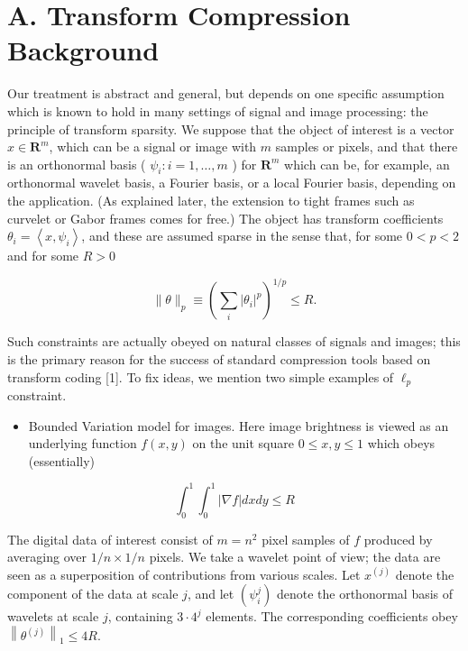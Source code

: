 \documentclass[10pt]{article}
\begin{document}
\section*{A. Transform Compression Background}
Our treatment is abstract and general, but depends on one specific assumption which is known to hold in many settings of signal and image processing: the principle of transform sparsity. We suppose that the object of interest is a vector $x \in \boldsymbol{R}^{m}$, which can be a signal or image with $m$ samples or pixels, and that there is an orthonormal basis ( $\psi_{i}: i=1, \ldots, m$ ) for $\boldsymbol{R}^{m}$ which can be, for example, an orthonormal wavelet basis, a Fourier basis, or a local Fourier basis, depending on the application. (As explained later, the extension to tight frames such as curvelet or Gabor frames comes for free.) The object has transform coefficients $\theta_{i}=\left\langle x, \psi_{i}\right\rangle$, and these are assumed sparse in the sense that, for some $0<p<2$ and for some $R>0$


\begin{equation*}
\|\theta\|_{p} \equiv\left(\sum_{i}\left|\theta_{i}\right|^{p}\right)^{1 / p} \leq R . \tag{I.1}
\end{equation*}


Such constraints are actually obeyed on natural classes of signals and images; this is the primary reason for the success of standard compression tools based on transform coding [1]. To fix ideas, we mention two simple examples of $\ell_{p}$ constraint.

\begin{itemize}
  \item Bounded Variation model for images. Here image brightness is viewed as an underlying function $f(x, y)$ on the unit square $0 \leq x, y \leq 1$ which obeys (essentially)
\end{itemize}

$$
\int_{0}^{1} \int_{0}^{1}|\nabla f| d x d y \leq R
$$

The digital data of interest consist of $m=n^{2}$ pixel samples of $f$ produced by averaging over $1 / n \times 1 / n$ pixels. We take a wavelet point of view; the data are seen as a superposition of contributions from various scales. Let $x^{(j)}$ denote the component of the data at scale $j$, and let $\left(\psi_{i}^{j}\right)$ denote the orthonormal basis of wavelets at scale $j$, containing $3 \cdot 4^{j}$ elements. The corresponding coefficients obey $\left\|\theta^{(j)}\right\|_{1} \leq 4 R$.
\end{document}

